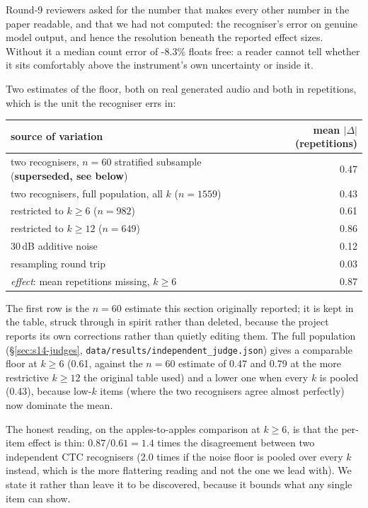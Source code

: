 \documentclass[11pt]{article}
\begin{document}
Round-9 reviewers asked for the number that makes every other number in the paper
readable, and that we had not computed: the recogniser's error on genuine model
output, and hence the resolution beneath the reported effect sizes. Without it a
median count error of -8.3\% floats free: a reader cannot tell whether it
sits comfortably above the instrument's own uncertainty or inside it.

Two estimates of the floor, both on real generated audio and both in
repetitions, which is the unit the recogniser errs in:

\begin{center}
\begin{tabular}{lr}
\toprule
source of variation & mean $|\Delta|$ (repetitions) \\
\midrule
two recognisers, $n{=}60$ stratified subsample (\textbf{superseded, see below}) & 0.47 \\
two recognisers, full population, all $k$ ($n{=}1559$) & 0.43 \\
\quad restricted to $k\ge6$ ($n{=}982$) & 0.61 \\
\quad restricted to $k\ge12$ ($n{=}649$) & 0.86 \\
30\,dB additive noise & 0.12 \\
resampling round trip & 0.03 \\
\midrule
\emph{effect}: mean repetitions missing, $k\ge6$ & 0.87 \\
\bottomrule
\end{tabular}
\end{center}

The first row is the $n{=}60$ estimate this section originally reported; it is
kept in the table, struck through in spirit rather than deleted, because the
project reports its own corrections rather than quietly editing them. The full
population (\S\ref{sec:s14-judges}, \texttt{data/results/independent\_judge.json})
gives a comparable floor at $k\ge6$ (0.61, against the $n{=}60$ estimate of 0.47
and 0.79 at the more restrictive $k\ge12$ the original table used) and a lower
one when every $k$ is pooled (0.43), because low-$k$ items (where the two
recognisers agree almost perfectly) now dominate the mean.

The honest reading, on the apples-to-apples comparison at $k\ge6$, is that the
per-item effect is thin: $0.87/0.61 = 1.4$ times the disagreement between two
independent CTC recognisers (2.0 times if the noise floor is pooled over every
$k$ instead, which is the more flattering reading and not the one we lead
with). We state it rather than leave it to be discovered, because it bounds
what any single item can show.
\end{document}
